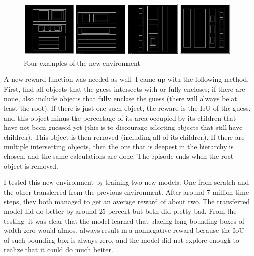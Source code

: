 \documentclass[
  digital,     %
  oneside,     %
  nosansbold,  %
  nocolorbold, %
  lof,         %
  lot,         %
]{fithesis4}
\begin{document}
\begin{figure}
    \centering
    \includegraphics[width=1\linewidth]{env_examples/env7.png}
    \caption{Four examples of the new environment}
    \label{fig:env7}
\end{figure}

A new reward function was needed as well. I came up with the following method. First, find all objects that the guess intersects with or fully encloses; if there are none, also include objects that fully enclose the guess (there will always be at least the root). If there is just one such object, the reward is the IoU of the guess, and this object minus the percentage of its area occupied by its children that have not been guessed yet (this is to discourage selecting objects that still have children). This object is then removed (including all of its children). If there are multiple intersecting objects, then the one that is deepest in the hierarchy is chosen, and the same calculations are done. The episode ends when the root object is removed.

I tested this new environment by training two new models. One from scratch and the other transferred from the previous environment. After around 7 million time steps, they both managed to get an average reward of about two. The transferred model did do better by around 25 percent but both did pretty bad. From the testing, it was clear that the model learned that placing long bounding boxes of width zero would almost always result in a nonnegative reward because the IoU of such bounding box is always zero, and the model did not explore enough to realize that it could do much better.
\end{document}

